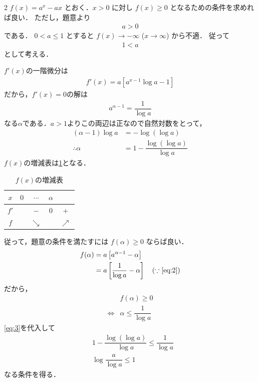 \documentclass[../../main.tex]{subfiles}
\begin{document}
\begin{multicols}{2}
  $f(x) = a^x - ax$ とおく．$x>0$ に対し $f(x)\ge 0$ となるための条件を求めれば良い．
  ただし，題意より
  \begin{align}
    a > 0
  \end{align}
  である．
  $0 < a \le 1$ とすると $f(x) \to -\infty$ ($x \to \infty$) から不適．
  従って
  \begin{align}
    1 < a \label{eq:1}
  \end{align}
  として考える．

  $f'(x)$の一階微分は
  \begin{align}
    f'(x) = a \left[ a^{x-1} \log a - 1 \right]
  \end{align}
  だから，$f'(x)=0$の解は
  \begin{align}
    a^{\alpha-1} = \dfrac{1}{\log a} \label{eq:2}
  \end{align}
  なる$\alpha$である．$a>1$よりこの両辺は正なので自然対数をとって，
  \begin{align}
    (\alpha-1) \log a & = - \log (\log a)                                     \\
    \therefore
    \alpha            & = 1 - \dfrac{\log(\log a)}{\log a} \label{eq:3}
  \end{align}
  $f(x)$の増減表は\cref{1993-4:table:1}となる．

  \begin{table}[H]
    \centering
    \caption{$f(x)$の増減表}
    \label{1993-4:table:1}
    \begin{tabular}{|c||c|c|c|c|}
      \hline
      $x$  & $0$ & $\cdots$   & $\alpha$ &            \\
      \hline
      $f'$ &     & $-$        & $0$      & $+$        \\
      \hline
      $f$  &     & $\searrow$ &          & $\nearrow$ \\
      \hline
    \end{tabular}
  \end{table}

  従って，題意の条件を満たすには $f(\alpha) \ge 0$ ならば良い．
  \begin{align}
    f(\alpha)
    & = a\left[a^{\alpha-1}-\alpha\right] \\
    & = a\left[\dfrac{1}{\log a} -\alpha\right] \quad (\because\text{\cref{eq:2}})
  \end{align}
  だから，
  \begin{align}
    & f(\alpha) \ge 0              \\
    \iff
    & \alpha \le \dfrac{1}{\log a }
  \end{align}
  \cref{eq:3}を代入して
  \begin{align}
    & 1 - \dfrac{\log(\log a)}{\log a} \le \dfrac{1}{\log a } \\
    & \log\dfrac{a}{\log a } \le 1
  \end{align}
  なる条件を得る．


\end{multicols}
\end{document}
